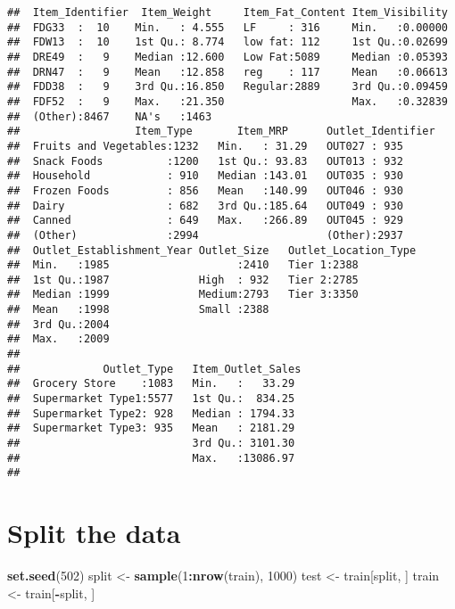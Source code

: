 \documentclass[]{article}
\newenvironment{Shaded}{\begin{snugshade}}{\end{snugshade}}
\newcommand{\KeywordTok}[1]{\textcolor[rgb]{0.13,0.29,0.53}{\textbf{#1}}}
\newcommand{\DecValTok}[1]{\textcolor[rgb]{0.00,0.00,0.81}{#1}}
\newcommand{\StringTok}[1]{\textcolor[rgb]{0.31,0.60,0.02}{#1}}
\newcommand{\OperatorTok}[1]{\textcolor[rgb]{0.81,0.36,0.00}{\textbf{#1}}}
\newcommand{\NormalTok}[1]{#1}
\begin{document}
\begin{verbatim}
##  Item_Identifier  Item_Weight     Item_Fat_Content Item_Visibility  
##  FDG33  :  10    Min.   : 4.555   LF     : 316     Min.   :0.00000  
##  FDW13  :  10    1st Qu.: 8.774   low fat: 112     1st Qu.:0.02699  
##  DRE49  :   9    Median :12.600   Low Fat:5089     Median :0.05393  
##  DRN47  :   9    Mean   :12.858   reg    : 117     Mean   :0.06613  
##  FDD38  :   9    3rd Qu.:16.850   Regular:2889     3rd Qu.:0.09459  
##  FDF52  :   9    Max.   :21.350                    Max.   :0.32839  
##  (Other):8467    NA's   :1463                                       
##                  Item_Type       Item_MRP      Outlet_Identifier
##  Fruits and Vegetables:1232   Min.   : 31.29   OUT027 : 935     
##  Snack Foods          :1200   1st Qu.: 93.83   OUT013 : 932     
##  Household            : 910   Median :143.01   OUT035 : 930     
##  Frozen Foods         : 856   Mean   :140.99   OUT046 : 930     
##  Dairy                : 682   3rd Qu.:185.64   OUT049 : 930     
##  Canned               : 649   Max.   :266.89   OUT045 : 929     
##  (Other)              :2994                    (Other):2937     
##  Outlet_Establishment_Year Outlet_Size   Outlet_Location_Type
##  Min.   :1985                    :2410   Tier 1:2388         
##  1st Qu.:1987              High  : 932   Tier 2:2785         
##  Median :1999              Medium:2793   Tier 3:3350         
##  Mean   :1998              Small :2388                       
##  3rd Qu.:2004                                                
##  Max.   :2009                                                
##                                                              
##             Outlet_Type   Item_Outlet_Sales 
##  Grocery Store    :1083   Min.   :   33.29  
##  Supermarket Type1:5577   1st Qu.:  834.25  
##  Supermarket Type2: 928   Median : 1794.33  
##  Supermarket Type3: 935   Mean   : 2181.29  
##                           3rd Qu.: 3101.30  
##                           Max.   :13086.97  
## 
\end{verbatim}

\section{Split the data}\label{split-the-data}

\begin{Shaded}
\begin{Highlighting}[]
\KeywordTok{set.seed}\NormalTok{(}\DecValTok{502}\NormalTok{)}
\NormalTok{split <-}\StringTok{ }\KeywordTok{sample}\NormalTok{(}\DecValTok{1}\OperatorTok{:}\KeywordTok{nrow}\NormalTok{(train), }\DecValTok{1000}\NormalTok{)}
\NormalTok{test <-}\StringTok{ }\NormalTok{train[split, ]}
\NormalTok{train <-}\StringTok{ }\NormalTok{train[}\OperatorTok{-}\NormalTok{split, ]}
\end{Highlighting}
\end{Shaded}
\end{document}

